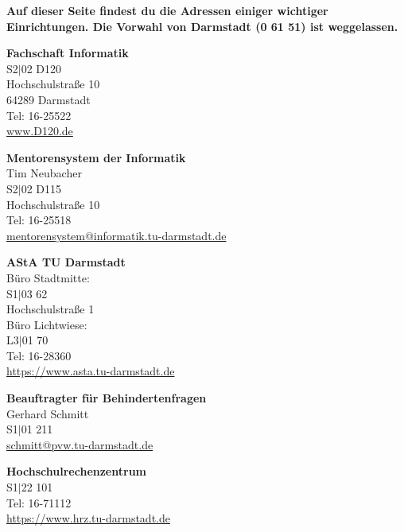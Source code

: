 
\textbf{Auf dieser Seite findest du die Adressen einiger wichtiger Einrichtungen. Die Vorwahl von Darmstadt (0 61 51) ist weggelassen.}

\begin{multicols}{2}

    \textbf{Fachschaft Informatik}\\
    S2$|$02 D120\\
    Hochschulstraße 10\\
    64289 Darmstadt\\
    Tel: 16-25522\\
    \url{www.D120.de}

    \vspace{3mm}
    \textbf{Mentorensystem der Informatik}\\
    Tim Neubacher\\
    S2$|$02 D115\\
    Hochschulstraße 10\\
    Tel: 16-25518\\
    \href{mailto:mentorensystem@informatik.tu-darmstadt.de}{mentorensystem@informatik.tu-darmstadt.de}

    \vspace{3mm}
    \textbf{AStA TU Darmstadt}\\
    Büro Stadtmitte:\\
    S1$|$03 62\\
    Hochschulstraße 1\\
    Büro Lichtwiese:\\
    L3$|$01 70\\
    Tel: 16-28360\\
    \url{https://www.asta.tu-darmstadt.de}

    \vspace{3mm}
    \textbf{Beauftragter für Behindertenfragen}\\
    Gerhard Schmitt\\
    S1$|$01 211\\
    \href{mailto:schmitt@pvw.tu-darmstadt.de}{schmitt@pvw.tu-darmstadt.de}

    \vspace{3mm}
    \textbf{Hochschulrechenzentrum}\\
    S1$|$22 101\\
    Tel: 16-71112\\
    \url{https://www.hrz.tu-darmstadt.de}


    \


\end{multicols}

